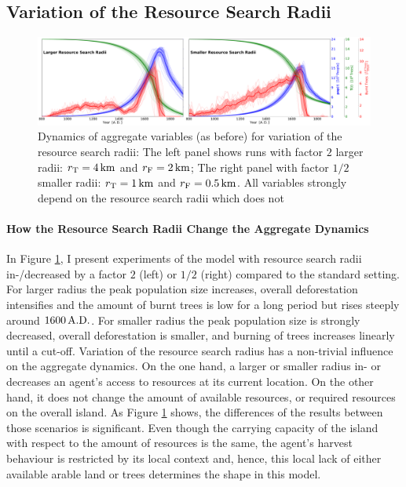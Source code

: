 \subsection{Variation of the Resource Search Radii}
\begin{figure}
	\centering
	\includegraphics[width=1.3\linewidth, center]{images/Results/EnsembleStatistics_largersmallerRad}
	\caption{Dynamics of aggregate variables (as before) for variation of the resource search radii: The left panel shows runs with factor $2$ larger radii: $r_{\rm T}=4\, {\rm km}$ and $r_{\rm F}=2\, {\rm km}$; The right panel with factor $1/2$ smaller radii: $r_{\rm T}=1\, {\rm km}$ and $r_{\rm F}=0.5\, {\rm km}$. All variables strongly depend on the resource search radii which does not}
	\label{fig:ensemblestatisticslargersmallerrad}
\end{figure}

\paragraph{How the Resource Search Radii Change the Aggregate Dynamics}
In Figure \ref{fig:ensemblestatisticslargersmallerrad}, I present experiments of the model with resource search radii in-/decreased by a factor $2$ (left) or  $1/2$ (right) compared to the standard setting. 
For larger radius the peak population size increases, overall deforestation intensifies and the amount of burnt trees is low for a long period but rises steeply around $1600\, {\rm A.D.}$.
For smaller radius the peak population size is strongly decreased, overall deforestation is smaller, and burning of trees increases linearly until a cut-off.
Variation of the resource search radius has a non-trivial influence on the aggregate dynamics.
On the one hand, a larger or smaller radius in- or decreases an agent's access to resources at its current location. 
On the other hand, it does not change the amount of available resources, or required resources on the overall island.
As Figure \ref{fig:ensemblestatisticslargersmallerrad} shows, the differences of the results between those scenarios is significant. 
Even though the carrying capacity of the island with respect to the amount of resources is the same, the agent's harvest behaviour is restricted by its local context and, hence, this local lack of either available arable land or trees determines the shape in this model.

